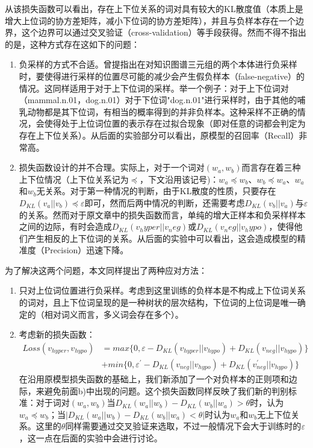 \documentclass[13pt]{article}
\begin{document}
从该损失函数可以看出，存在上下位关系的词对具有较大的KL散度值（本质上是增大上位词的协方差矩阵，减小下位词的协方差矩阵），并且与负样本存在一个边界，这个边界可以通过交叉验证（cross-validation）等手段获得。然而不得不指出的是，这种方式存在这如下的问题：
\begin{enumerate}[label=\alph*)]
\item 负采样的方式不合适。\cite{he2015learning}曾提指出在对知识图谱三元组的两个本体进行负采样时，要使得进行采样的位置尽可能的减少会产生假负样本（false-negative）的情况。这同样适用于对于上下位词的采样。举一个例子：对于上下位词对（mammal.n.01，dog.n.01）对于下位词"dog.n.01"进行采样时，由于其他的哺乳动物都是其下位词，有相当的概率得到的并非负样本。这种采样不正确的情况，会使得处于上位词位置的表示存在过拟合现象（即对任意的词都会判定为存在上下位关系）。从后面的实验部分可以看出，原模型的召回率（Recall）非常高。

\item 损失函数设计的并不合理。实际上，对于一个词对$(w_a,w_b)$而言存在着三种上下位情况（上下位关系记为$\preceq$，下文沿用该记号)：$w_a \preceq w_b$、$w_b \preceq w_a$、$w_a$和$w_b$无关系。对于第一种情况的判断，由于KL散度的性质，只要存在$D_{KL}(v_a || v_b) \preceq \varepsilon$即可，然而后两中情况的判断，还需要考虑$D_{KL}(v_b || v_a)$与$\varepsilon$的关系。然而对于原文章中的损失函数而言，单纯的增大正样本和负采样样本之间的边际，有时会造成$D_{KL}(v_hyper||v_neg)$或$D_{KL}(v_neg||v_hypo)$，使得他们产生相反的上下位词的关系。从后面的实验中可以看出，这会造成模型的精准度（Precision）迅速下降。
\end{enumerate}
为了解决这两个问题，本文同样提出了两种应对方法：
\begin{enumerate}[label=\alph*)]
\item 只对上位词位置进行负采样。考虑到这里训练的负样本是不构成上下位词关系的词对，且上下位词呈现的是一种树状的层次结构，下位词的上位词是唯一确定的（相对词义而言，多义词会存在多个）。

\item 考虑新的损失函数：
\begin{align*}
Loss(v_{hyper},v_{hypo}) &= max \{0, \varepsilon - D_{KL}(v_{hyper} || v_{hypo}) + D_{KL}(v_{neg} || v_{hypo})\} \\
                         &+ min \{0, \varepsilon^{'} - D_{KL}(v_{neg} || v_{hypo}) + D_{KL}(v_{neg}^{'} || v_{hypo})\}
\end{align*}
在沿用原模型损失函数的基础上，我们新添加了一个对负样本的正则项和边际，来避免前面b)中出现的问题。这个损失函数同样反映了我们新的判别标准：对于词对$(w_a,w_b)$当$D_{KL}(w_a||w_b)-D_{KL}(w_b||w_a) > \theta$时，认为$w_a \preceq w_b$；当$|D_{KL}(w_a||w_b)-D_{KL}(w_b||w_a) < \theta|$时认为$w_a$和$w_b$无上下位关系。这里的$\theta$同样需要通过交叉验证来选取，不过一般情况下会大于训练时的$\varepsilon$，这一点在后面的实验中会进行讨论。
\end{enumerate}
\end{document}
